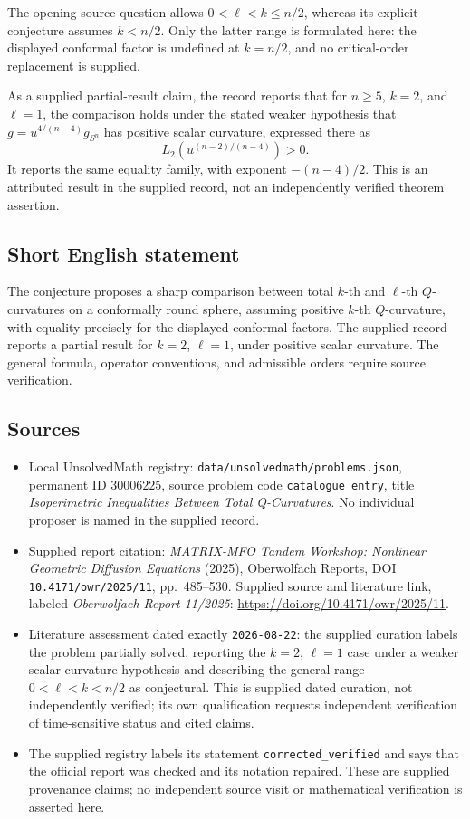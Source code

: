 \documentclass[11pt]{article}
\begin{document}
The opening source question allows \(0<\ell<k\leq n/2\), whereas its explicit conjecture assumes \(k<n/2\). Only the latter range is formulated here: the displayed conformal factor is undefined at \(k=n/2\), and no critical-order replacement is supplied.

As a supplied partial-result claim, the record reports that for \(n\geq5\), \(k=2\), and \(\ell=1\), the comparison holds under the stated weaker hypothesis that \(g=u^{4/(n-4)}g_{S^n}\) has positive scalar curvature, expressed there as
\[
L_2\!\left(u^{(n-2)/(n-4)}\right)>0.
\]
It reports the same equality family, with exponent \(-(n-4)/2\). This is an attributed result in the supplied record, not an independently verified theorem assertion.
\subsection{Short English statement}
The conjecture proposes a sharp comparison between total \(k\)-th and \(\ell\)-th \(Q\)-curvatures on a conformally round sphere, assuming positive \(k\)-th \(Q\)-curvature, with equality precisely for the displayed conformal factors. The supplied record reports a partial result for \(k=2\), \(\ell=1\), under positive scalar curvature. The general formula, operator conventions, and admissible orders require source verification.
\subsection{Sources}
\begin{itemize}
\item Local UnsolvedMath registry: \texttt{data/unsolvedmath/problems.json}, permanent ID \(30006225\), source problem code \texttt{catalogue entry}, title \emph{Isoperimetric Inequalities Between Total Q-Curvatures}. No individual proposer is named in the supplied record.
\item Supplied report citation: \emph{MATRIX-MFO Tandem Workshop: Nonlinear Geometric Diffusion Equations} (2025), Oberwolfach Reports, DOI \texttt{10.4171/owr/2025/11}, pp.\ 485--530. Supplied source and literature link, labeled \emph{Oberwolfach Report 11/2025}: \url{https://doi.org/10.4171/owr/2025/11}.
\item Literature assessment dated exactly \texttt{2026-08-22}: the supplied curation labels the problem partially solved, reporting the \(k=2\), \(\ell=1\) case under a weaker scalar-curvature hypothesis and describing the general range \(0<\ell<k<n/2\) as conjectural. This is supplied dated curation, not independently verified; its own qualification requests independent verification of time-sensitive status and cited claims.
\item The supplied registry labels its statement \texttt{corrected\_verified} and says that the official report was checked and its notation repaired. These are supplied provenance claims; no independent source visit or mathematical verification is asserted here.
\end{itemize}
\end{document}
